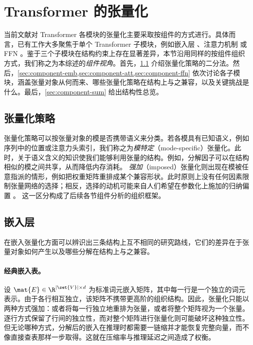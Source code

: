 \section{Transformer 的张量化}
\label{sec:components}

当前文献对 Transformer 各模块的张量化主要采取按组件的方式进行。具体而言，已有工作大多聚焦于单个 Transformer 子模块，例如嵌入层 \cite{xu2023tensorgpt}、注意力机制 \cite{ma2019tensorized} 或 FFN \cite{chekalina2023ttm}。鉴于三个子模块在结构约束上存在显著差异，本节沿用同样的按组件组织方式，我们称之为本综述的\emph{组件视角}。首先，\cref{sec:tensor-strategies} 介绍张量化策略的二分法。然后，\cref{sec:component-emb,sec:component-att,sec:component-ffn} 依次讨论各子模块，涵盖张量对象从何而来、哪些张量化策略在结构上与之兼容，以及关键挑战是什么。最后，\cref{sec:component-sum} 给出结构性总览。


\subsection{张量化策略}
\label{sec:tensor-strategies}

张量化策略可以按张量对象的模是否携带语义来分类。若各模具有已知语义，例如序列中的位置或注意力头索引，我们称之为\emph{模特定}（mode-specific）张量化。此时，关于语义含义的知识使我们能够利用张量的结构。例如，分解因子可以在结构相似的模之间共享，从而降低内存消耗。
\emph{强加}（imposed）张量化则出现在模被任意指派的情形，例如把权重矩阵重排成某个兼容形状。此时原则上没有任何因素限制张量网络的选择；相反，选择的动机可能来自人们希望在参数化上施加的归纳偏置 \cite{hamreras2025tensorization}。
这一区分构成了后续各节组件分析的组织框架。


\subsection{嵌入层}
\label{sec:component-emb}

在嵌入张量化方面可以辨识出三条结构上互不相同的研究路线，它们的差异在于张量对象如何产生以及哪些分解在结构上与之兼容。

\paragraph{经典嵌入表。}
设 $\mat{E} \in \R^{|\set{V}| \times d}$ 为标准词元嵌入矩阵，其中每一行是一个独立的词元表示。由于各行相互独立，该矩阵不携带更高阶的组织结构。因此，张量化只能以两种方式强加：或者将每一行独立地重排为张量，或者将整个矩阵视为一个张量。逐行方式保留了行间的独立性，而对整个矩阵进行张量化则可能破坏这种独立性。但无论哪种方式，分解后的嵌入在推理时都需要一链缩并才能恢复完整向量，而不像直接查表那样一步取得。这就在压缩率与推理延迟之间造成了权衡。

